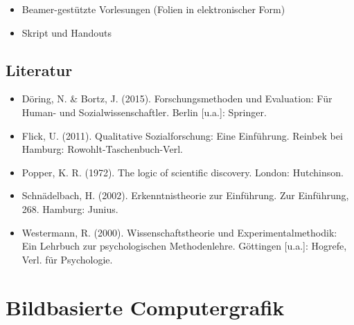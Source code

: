 \begin{itemize}
\tightlist
\item
  Beamer-gestützte Vorlesungen (Folien in elektronischer Form)
\item
  Skript und Handouts
\end{itemize}

\section*{Literatur\label{/mi-2017/modulbeschreibungen-master/MA_SC_WPF_eScience}}\label{literaturpathlabelmi-2017modulbeschreibungen-mastermaux5fscux5fwpfux5fescience}

\begin{itemize}
\tightlist
\item
  Döring, N. \& Bortz, J. (2015). Forschungsmethoden und Evaluation: Für
  Human- und Sozialwissenschaftler. Berlin {[}u.a.{]}: Springer.
\item
  Flick, U. (2011). Qualitative Sozialforschung: Eine Einführung.
  Reinbek bei Hamburg: Rowohlt-Taschenbuch-Verl.
\item
  Popper, K. R. (1972). The logic of scientific discovery. London:
  Hutchinson.
\item
  Schnädelbach, H. (2002). Erkenntnistheorie zur Einführung. Zur
  Einführung, 268. Hamburg: Junius.
\item
  Westermann, R. (2000). Wissenschaftstheorie und Experimentalmethodik:
  Ein Lehrbuch zur psychologischen Methodenlehre. Göttingen {[}u.a.{]}:
  Hogrefe, Verl. für Psychologie.
\end{itemize}

\chapter{Bildbasierte
Computergrafik\label{/mi-2017/modulbeschreibungen-master/MA_VC_Modul_BildbasierteComputergrafik}}\label{bildbasierte-computergrafikpathlabelmi-2017modulbeschreibungen-mastermaux5fvcux5fmodulux5fbildbasiertecomputergrafik}

